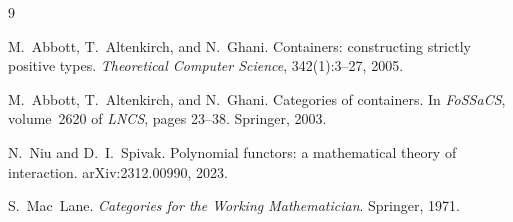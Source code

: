 \documentclass[11pt,a4paper]{article}
\theoremstyle{plain}
\theoremstyle{definition}
\begin{document}
\begin{thebibliography}{9}

M.~Abbott, T.~Altenkirch, and N.~Ghani.
\newblock Containers: constructing strictly positive types.
\newblock \emph{Theoretical Computer Science}, 342(1):3--27, 2005.

M.~Abbott, T.~Altenkirch, and N.~Ghani.
\newblock Categories of containers.
\newblock In \emph{FoSSaCS}, volume~2620 of \emph{LNCS}, pages 23--38.
\newblock Springer, 2003.

N.~Niu and D.~I.~Spivak.
\newblock Polynomial functors: a mathematical theory of interaction.
\newblock arXiv:2312.00990, 2023.

S.~Mac~Lane.
\newblock \emph{Categories for the Working Mathematician}.
\newblock Springer, 1971.

\end{thebibliography}
\end{document}
